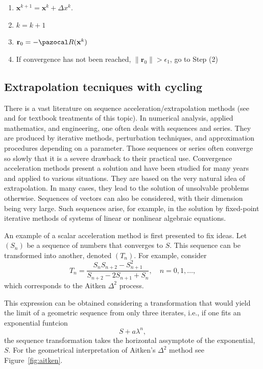 \begin{framedbox}[htbp]
\begin{center}
\begin{minipage}{0.9\textwidth}
\begin{enumerate}[(i)]
\begin{enumerate}[(1)]
\begin{enumerate}[(a)]
      \end{enumerate}
    \item \(\mathbf x^{k+1} = \mathbf x^k + \Delta x^k\).
    \item \(k=k+1\)
    \item \(\mathbf r_0 = -\pazocal R(\mathbf x^k)\)
    \item If convergence has not been reached, \(\|\mathbf r_0\| > \epsilon_1\), go to Step (2)
    \end{enumerate}
    \end{enumerate}
    \end{minipage}
  \end{center}
\end{framedbox}

\subsection{Extrapolation tecniques with cycling}

There is a vast literature on sequence acceleration/extrapolation methods (see  \cite{brezinski_extrapolation_2013} and \cite{sidi_vector_2017} for textbook treatments of this topic).
In numerical analysis, applied mathematics, and engineering, one often deals with sequences and series.
They are produced by iterative methods, perturbation techniques, and approximation procedures depending on a parameter.
Those sequences or series often converge so slowly that it is a severe drawback to their practical use.
Convergence acceleration methods present a solution and have been studied for many years and applied to various situations.
They are based on the very natural idea of extrapolation.
In many cases, they lead to the solution of unsolvable problems otherwise.
Sequences of vectors can also be considered, with their dimension being very large.
Such sequences arise, for example, in the solution by fixed-point iterative methods of systems of linear or nonlinear algebraic equations.

An example of a scalar acceleration method is first presented to fix ideas.
Let \((S_n)\) be a sequence of numbers that converges to \(S\).
This sequence can be transformed into another, denoted \((T_n)\).
For example, consider
\begin{equation}
  T_n = \frac{S_n S_{n+2} - S^2_{n+1}}{S_{n+2}-2S_{n+1} + S_n},\quad n=0,1,\dots,
\end{equation}
which corresponds to the Aitken \(\Delta^2\) process.

This expression can be obtained considering a transformation that would yield the limit of a geometric sequence from only three iterates, i.e., if one fits an exponential funtcion
\begin{equation}
  S + a \lambda^n,
\end{equation}
the sequence transformation takes the horizontal assymptote of the exponential, \(S\).
For the geometrical interpretation of Aitken's \(\Delta^2\) method see Figure~\ref{fig:aitken}.

